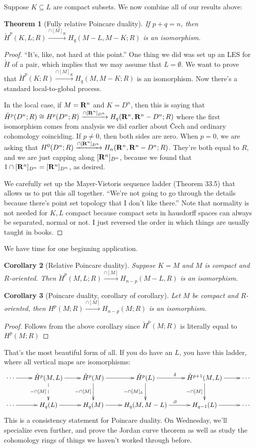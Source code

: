 \documentclass{amsart}
\theoremstyle{theorem}
\newtheorem{theorem}{Theorem}[section]
\newtheorem{corollary}[theorem]{Corollary}
\theoremstyle{definition}
\newcommand\cHH{\check{H}}
\begin{document}
Suppose $K\subseteq L$ are compact subsets. We now combine all of our results above:
\begin{theorem}[Fully relative Poincare duality]
If $p+q=n$, then $\cHH^p(K,L;R)\xrightarrow{\cap[M]_K}H_q(M-L,M-K;R)$ is an isomorphism.
\end{theorem}
\begin{proof}
``It's, like, not hard at this point.'' One thing we did was set up an LES for $\cHH$ of a pair, which implies that we may assume that $L=\emptyset$. We want to prove that $\cHH^p(K;R)\xrightarrow{\cap[M]_K}H_q(M,M-K;R)$ is an isomorphism. Now there's a standard local-to-global process.

In the local case, if $M=\mathbf R^n$ and $K=D^n$, then this is saying that $\cHH^p(D^n;R)\cong H^p(D^n;R)\xrightarrow{\cap[\RR^n]_{D^n}}H_q(\RR^n,\RR^n-D^n;R)$ where the first isomorphism comes from analysis we did earlier about \v{C}ech and ordinary cohomology coinciding. If $p\neq 0$, then both sides are zero. When $p=0$, we are asking that $H^0(D^n;R)\xrightarrow{\cap[\mathbf R^n]_{D^n}}H_n(\mathbf R^n,\mathbf R^n-D^n;R)$. They're both equal to $R$, and we are just capping along $[\mathbf R^n]_{D^n}$, because we found that $1\cap[\mathbf R^n]_{D^n}=[\mathbf R^n]_{D^n}$, as desired.

We carefully set up the Mayer-Vietoris sequence ladder (Theorem 33.5) that allows us to put this all together. ``We're not going to go through the details because there's point set topology that I don't like there.'' Note that normality is not needed for $K,L$ compact because compact sets in hausdorff spaces can always be separated, normal or not. I just reversed the order in which things are usually taught in books.
\end{proof}
We have time for one beginning application.
\begin{corollary}[Relative Poincare duality]
Suppose $K=M$ and $M$ is compact and $R$-oriented. Then $\cHH^p(M,L;R)\xrightarrow{\cap[M]}H_{n-p}(M-L,R)$ is an isomorphism.
\end{corollary}
\begin{corollary}[Poincare duality, corollary of corollary]
Let $M$ be compact and $R$-oriented, then $H^p(M;R)\xrightarrow{\cap [M]}H_{n-p}(M;R)$ is an isomorphism.
\end{corollary}
\begin{proof}
Follows from the above corollary since $\cHH^p(M;R)$ is literally equal to $H^p(M;R)$
\end{proof}
That's the most beautiful form of all. If you do have an $L$, you have this ladder, where all vertical maps are isomorphisms:
\begin{equation*}
\xymatrix{
	\cdots\ar[r] & \cHH^p(M,L)\ar[r]\ar@{-->}[d]_{-\cap [M]} & \cHH^p(M)\ar[r]\ar[d]_{-\cap [M]} & \cHH^p(L)\ar[r]^\delta\ar[d]_{-\cap [M]_L} & \cHH^{p+1}(M,L)\ar[r]\ar[d]_{-\cap [M]} & \cdots\\
	\cdots\ar[r] & H_q(L)\ar[r]& H_q(M)\ar[r] & H_q(M,M-L)\ar[r]^\partial & H_{q-1}(L)\ar[r] & \cdots
}
\end{equation*}
This is a consistency statement for Poincare duality. On Wednesday, we'll specialize even further, and prove the Jordan curve theorem as well as study the cohomology rings of things we haven't worked through before.
\end{document}
